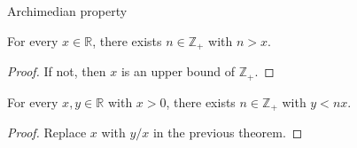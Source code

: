 \documentclass{beamer}
\begin{document}
\begin{frame}{Archimedian property}
\begin{thm}
For every $x\in\mathbb{R}$, there exists $n\in\mathbb{Z}_+$ with $n>x$.
\end{thm}
\pause
\begin{proof}
If not, then $x$ is an upper bound of $\mathbb{Z}_+$.
\end{proof}
\pause
\begin{thm}
For every $x,y\in\mathbb{R}$ with $x>0$, there exists $n\in\mathbb{Z}_+$ with $y<nx$.
\end{thm}
\pause
\begin{proof}
Replace $x$ with $y/x$ in the previous theorem.
\end{proof}
\end{frame}
\end{document}
